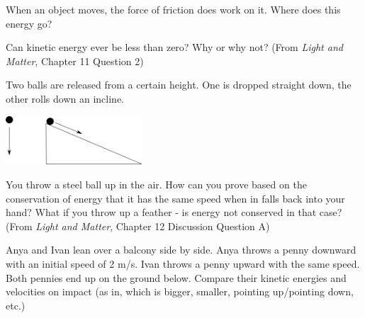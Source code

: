 \documentclass[12pt]{exam}
\begin{document}
\clearpage
\begin{questions}
\question When an object moves, the force of friction does work on it. Where does this energy go?
\vspace{1.5in}

\question Can kinetic energy ever be less than zero? Why or why not? (From \textit{Light and Matter}, Chapter 11 Question 2)
\vspace{1.5in}

\question Two balls are released from a certain height. One is dropped straight down, the other rolls down an incline.
\begin{center}
	\includegraphics[width=2in]{../images/droppingBalls.png}
\end{center}

\question You throw a steel ball up in the air. How can you prove based on the conservation of energy that it has the same speed when in falls back into your hand? What if you throw up a feather - is energy not conserved in that case? (From \textit{Light and Matter}, Chapter 12 Discussion Question A)
\vspace{1.5in}

\question Anya and Ivan lean over a balcony side by side. Anya throws a penny downward with an initial speed of 2 m/s. Ivan throws a penny upward with the same speed. Both pennies end up on the ground below. Compare their kinetic energies and velocities on impact (as in, which is bigger, smaller, pointing up/pointing down, etc.)
\vspace{2in}



\end{questions}
\end{document}
